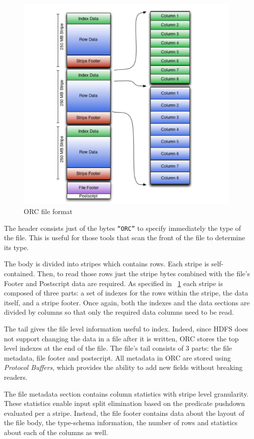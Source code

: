 \documentclass[10pt, a4paper]{report}
\begin{document}
\begin{figure}
	\centering
	\includegraphics[width=11cm]{./assets/img/orc_format.png}
	\caption{ORC file format}
	\label{fig:orc_format}
	\vspace{0.5cm}
\end{figure}

The header consists just of the bytes \texttt{``ORC''} to specify immediately the type of the file. This is useful for those tools that scan the front of the file to determine its type.

The body is divided into stripes which contains rows. Each stripe is self-contained. Then, to read those rows just the stripe bytes combined with the file’s Footer and Postscript data are required. As specified in \figurename~\ref{fig:orc_format} each stripe is composed of three parts: a set of indexes for the rows within the stripe, the data itself, and a stripe footer. Once again, both the indexes and the data sections are divided by columns so that only the required data columns need to be read.

The tail gives the file level information useful to index. Indeed, since HDFS does not support changing the data in a file after it is written, ORC stores the top level indexes at the end of the file. The file’s tail consists of 3 parts: the file metadata, file footer and postscript. All metadata in ORC are stored using \textit{Protocol Buffers}\cite{protocol_buffers}, which provides the ability to add new fields without breaking readers.

The file metadata section contains column statistics with stripe level granularity. These statistics enable input split elimination based on the predicate pushdown evaluated per a stripe. Instead, the file footer contains data about the layout of the file body, the type-schema information, the number of rows and statistics about each of the columns as well.
\end{document}
